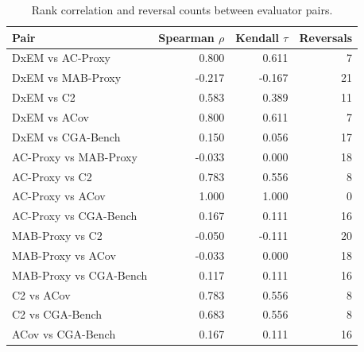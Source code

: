\begin{table}[htbp]
\centering
\caption{Rank correlation and reversal counts between evaluator pairs.}
\label{tab:rank-reversal}
\begin{tabular}{lrrr}
\toprule
Pair & Spearman $\rho$ & Kendall $\tau$ & Reversals \\
\midrule
DxEM vs AC-Proxy & 0.800 & 0.611 & 7 \\
DxEM vs MAB-Proxy & -0.217 & -0.167 & 21 \\
DxEM vs C2 & 0.583 & 0.389 & 11 \\
DxEM vs ACov & 0.800 & 0.611 & 7 \\
DxEM vs CGA-Bench & 0.150 & 0.056 & 17 \\
AC-Proxy vs MAB-Proxy & -0.033 & 0.000 & 18 \\
AC-Proxy vs C2 & 0.783 & 0.556 & 8 \\
AC-Proxy vs ACov & 1.000 & 1.000 & 0 \\
AC-Proxy vs CGA-Bench & 0.167 & 0.111 & 16 \\
MAB-Proxy vs C2 & -0.050 & -0.111 & 20 \\
MAB-Proxy vs ACov & -0.033 & 0.000 & 18 \\
MAB-Proxy vs CGA-Bench & 0.117 & 0.111 & 16 \\
C2 vs ACov & 0.783 & 0.556 & 8 \\
C2 vs CGA-Bench & 0.683 & 0.556 & 8 \\
ACov vs CGA-Bench & 0.167 & 0.111 & 16 \\
\bottomrule
\end{tabular}
\end{table}
